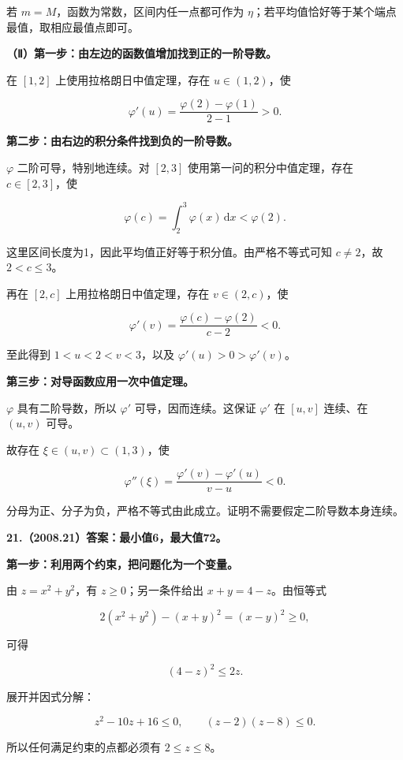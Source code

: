\documentclass[UTF8,11pt,fontset=windows]{ctexart}
\begin{document}
若 $m=M$，函数为常数，区间内任一点都可作为 $\eta$；若平均值恰好等于某个端点最值，取相应最值点即可。

\textbf{（Ⅱ）第一步：由左边的函数值增加找到正的一阶导数。}

在 $[1,2]$ 上使用拉格朗日中值定理，存在 $u\in(1,2)$，使

$$
\varphi'(u)=\frac{\varphi(2)-\varphi(1)}{2-1}>0.
$$

\textbf{第二步：由右边的积分条件找到负的一阶导数。}

$\varphi$ 二阶可导，特别地连续。对 $[2,3]$ 使用第一问的积分中值定理，存在 $c\in[2,3]$，使

$$
\varphi(c)=\int_2^3\varphi(x)\,\mathrm dx<\varphi(2).
$$

这里区间长度为1，因此平均值正好等于积分值。由严格不等式可知 $c\ne2$，故 $2<c\le3$。

再在 $[2,c]$ 上用拉格朗日中值定理，存在 $v\in(2,c)$，使

$$
\varphi'(v)=\frac{\varphi(c)-\varphi(2)}{c-2}<0.
$$

至此得到 $1<u<2<v<3$，以及 $\varphi'(u)>0>\varphi'(v)$。

\textbf{第三步：对导函数应用一次中值定理。}

$\varphi$ 具有二阶导数，所以 $\varphi'$ 可导，因而连续。这保证 $\varphi'$ 在 $[u,v]$ 连续、在 $(u,v)$ 可导。

故存在 $\xi\in(u,v)\subset(1,3)$，使

$$
\boxed{\varphi''(\xi)
=\frac{\varphi'(v)-\varphi'(u)}{v-u}<0}.
$$

分母为正、分子为负，严格不等式由此成立。证明不需要假定二阶导数本身连续。

\clearpage

\textbf{21.（2008.21）答案：最小值6，最大值72。}

\textbf{第一步：利用两个约束，把问题化为一个变量。}

由 $z=x^2+y^2$，有 $z\ge0$；另一条件给出 $x+y=4-z$。由恒等式

$$
2(x^2+y^2)-(x+y)^2=(x-y)^2\ge0,
$$

可得

$$
(4-z)^2\le2z.
$$

展开并因式分解：

$$
z^2-10z+16\le0,
\qquad(z-2)(z-8)\le0.
$$

所以任何满足约束的点都必须有 $\boxed{2\le z\le8}$。
\end{document}
